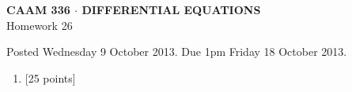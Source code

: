 \documentclass[10pt]{article}
\begin{document}
\vspace*{-5em}
\begin{center}
\large \textsf{\textbf{CAAM 336 $\cdot$ DIFFERENTIAL EQUATIONS}\\[0.5em]
Homework 26 }
\end{center}

Posted Wednesday 9 October 2013.  Due 1pm Friday 18 October 2013.

\begin{enumerate}\addtocounter{enumi}{25}
\item {[25 points]}  
\end{enumerate}
\end{document}
